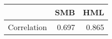 \begin{tabular}{lrr}
\toprule
{} &    SMB &    HML \\
\midrule
Correlation &  0.697 &  0.865 \\
\bottomrule
\end{tabular}
